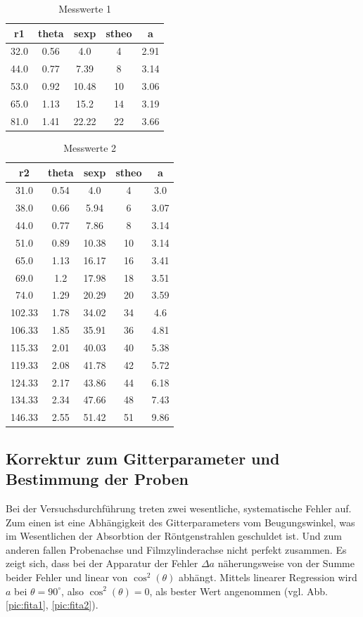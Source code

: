 \begin{table}[H]
 \begin{tabular}{c|c|c|c|c}
 r1	&theta&	sexp&	stheo&	a\\
 \hline
32.0&	0.56&	4.0&	4&	2.91\\
44.0&	0.77&	7.39&	8&	3.14\\
53.0&	0.92&	10.48&	10&	3.06\\
65.0&	1.13&	15.2&	14&	3.19\\
81.0&	1.41&	22.22&	22&	3.66
  
 \end{tabular}
 \caption{Messwerte 1}
 \label{tab:messreihe1}

\end{table}

\begin{table}[H]
 \begin{tabular}{c|c|c|c|c}
r2&	theta&	sexp&	stheo&	a\\
\hline
31.0&	0.54&	4.0&	4&	3.0\\
38.0&	0.66&	5.94&	6&	3.07\\
44.0&	0.77&	7.86&	8&	3.14\\
51.0&	0.89&	10.38&	10&	3.14\\
65.0&	1.13&	16.17&	16&	3.41\\
69.0&	1.2&	17.98&	18&	3.51\\
74.0&	1.29&	20.29&	20&	3.59\\
102.33&	1.78&	34.02&	34&	4.6\\
106.33&	1.85&	35.91&	36&	4.81\\
115.33&	2.01&	40.03&	40&	5.38\\
119.33&	2.08&	41.78&	42&	5.72\\
124.33&	2.17&	43.86&	44&	6.18\\
134.33&	2.34&	47.66&	48&	7.43\\
146.33&	2.55&	51.42&	51&	9.86\\
  
 \end{tabular}
 \caption{Messwerte 2}
 \label{tab:messreihe2}

\end{table}

\subsection{Korrektur zum Gitterparameter und Bestimmung der Proben}
Bei der Versuchsdurchführung treten zwei wesentliche, systematische Fehler auf. Zum einen ist eine Abhängigkeit des Gitterparameters vom Beugungswinkel,
was im Wesentlichen der Absorbtion der Röntgenstrahlen geschuldet ist. Und zum anderen fallen Probenachse und Filmzylinderachse nicht perfekt zusammen.
Es zeigt sich, dass bei der Apparatur der Fehler $\Delta a$ näherungsweise von der Summe beider Fehler und linear von $\cos^2(\theta)$ abhängt. Mittels
linearer Regression wird $a$ bei $\theta = 90^\circ$, also $\cos^2(\theta)=0$, als bester Wert angenommen (vgl. Abb. \ref{pic:fita1}, \ref{pic:fita2}). 

